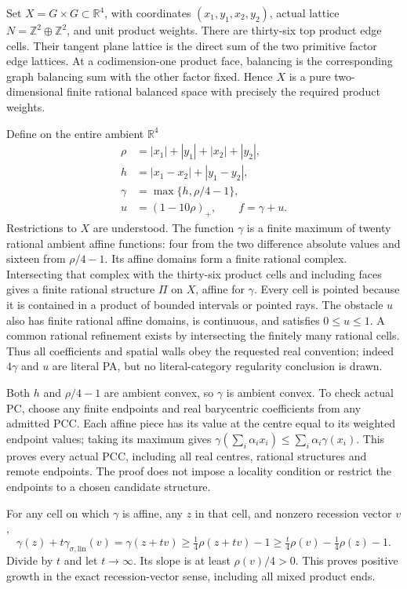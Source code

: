 \documentclass[
  10pt,
]{article}
\begin{document}
Set \(X=G\times G\subset\mathbb R^4\), with coordinates
\((x_1,y_1,x_2,y_2)\), actual lattice
\(N=\mathbb Z^2\oplus\mathbb Z^2\), and unit product weights. There are
thirty-six top product edge cells. Their tangent plane lattice is the
direct sum of the two primitive factor edge lattices. At a
codimension-one product face, balancing is the corresponding graph
balancing sum with the other factor fixed. Hence \(X\) is a pure
two-dimensional finite rational balanced space with precisely the
required product weights.

Define on the entire ambient \(\mathbb R^4\) \[
\begin{split}
 \rho&=|x_1|+|y_1|+|x_2|+|y_2|,\\
 h&=|x_1-x_2|+|y_1-y_2|,\\
 \gamma&=\max\{h,\rho/4-1\},\\
 u&=(1-10\rho)_+,\qquad f=\gamma+u.
\end{split} \tag{5}
\] Restrictions to \(X\) are understood. The function \(\gamma\) is a
finite maximum of twenty rational ambient affine functions: four from
the two difference absolute values and sixteen from \(\rho/4-1\). Its
affine domains form a finite rational complex. Intersecting that complex
with the thirty-six product cells and including faces gives a finite
rational structure \(\Pi\) on \(X\), affine for \(\gamma\). Every cell
is pointed because it is contained in a product of bounded intervals or
pointed rays. The obstacle \(u\) also has finite rational affine
domains, is continuous, and satisfies \(0\leq u\leq1\). A common
rational refinement exists by intersecting the finitely many rational
cells. Thus all coefficients and spatial walls obey the requested real
convention; indeed \(4\gamma\) and \(u\) are literal PA, but no
literal-category regularity conclusion is drawn.

Both \(h\) and \(\rho/4-1\) are ambient convex, so \(\gamma\) is ambient
convex. To check actual PC, choose any finite endpoints and real
barycentric coefficients from any admitted PCC. Each affine piece has
its value at the centre equal to its weighted endpoint values; taking
its maximum gives
\(\gamma(\sum_i\alpha_ix_i)\leq\sum_i\alpha_i\gamma(x_i)\). This proves
every actual PCC, including all real centres, rational structures and
remote endpoints. The proof does not impose a locality condition or
restrict the endpoints to a chosen candidate structure.

For any cell on which \(\gamma\) is affine, any \(z\) in that cell, and
nonzero recession vector \(v\), \[
 \gamma(z)+t\gamma_{\sigma,\mathrm{lin}}(v)
 =\gamma(z+tv)\geq\tfrac14\rho(z+tv)-1
 \geq\tfrac t4\rho(v)-\tfrac14\rho(z)-1.
\] Divide by \(t\) and let \(t\to\infty\). Its slope is at least
\(\rho(v)/4>0\). This proves positive growth in the exact
recession-vector sense, including all mixed product ends.
\end{document}
